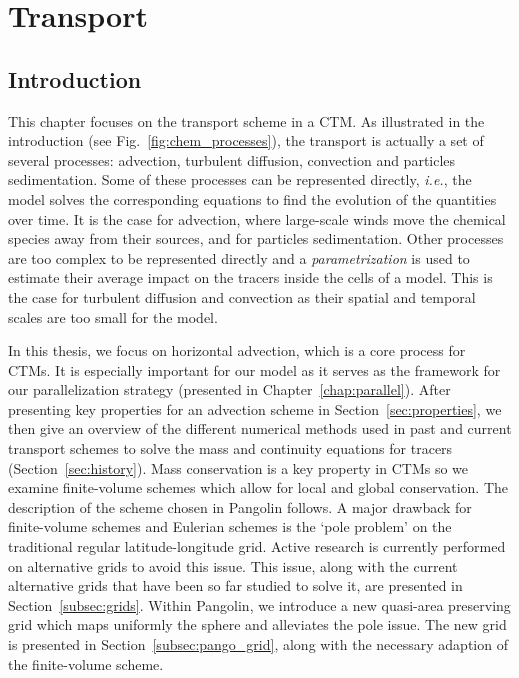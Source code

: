 \chapter{Transport}
\label{chap:transport}

\section{Introduction}
This chapter focuses on the transport scheme in a CTM\@. As illustrated in the
introduction (see Fig.~\ref{fig:chem_processes}), the transport is actually a
set of several processes: advection, turbulent diffusion, convection and
particles sedimentation. Some of these processes can be represented directly,
\textit{i.e.}, the model solves the corresponding equations to find the
evolution of the quantities over time. It is the case for advection, where
large-scale winds move the chemical species away from their sources, and for
particles sedimentation. Other processes are too complex to be represented
directly and a \textit{parametrization} is used to estimate their average impact
on the tracers inside the cells of a model. This is the case for turbulent
diffusion and convection as their spatial and temporal scales are too small for
the model.

\renewcommand{\thefigure}{\arabic{chapter}.\arabic{figure}}

In this thesis, we focus on horizontal advection, which is a core process for
CTMs. It is especially important for our model as it serves as the framework for our
parallelization strategy (presented in Chapter~\ref{chap:parallel}). After
presenting key properties for an advection scheme in
Section~\ref{sec:properties}, we then give an overview of the different
numerical methods used in past and current transport schemes to solve the mass
and continuity equations for tracers (Section~\ref{sec:history}).  Mass
conservation is a key property in CTMs so we examine finite-volume schemes which
allow for local and global conservation. The description of the scheme chosen in
Pangolin follows.  A major drawback for finite-volume schemes and Eulerian
schemes is the `pole problem' on the traditional regular latitude-longitude
grid. Active research is currently performed on alternative grids to avoid this
issue. This issue, along with the current alternative grids that have been so
far studied to solve it, are presented in Section~\ref{subsec:grids}. Within
Pangolin, we introduce a new quasi-area preserving grid which maps uniformly the
sphere and alleviates the pole issue. The new grid is presented in
Section~\ref{subsec:pango_grid}, along with the necessary adaption of the
finite-volume scheme.

